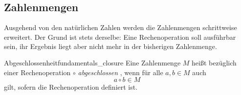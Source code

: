 \subsection{Zahlenmengen}
\label{subsec:fundamentals_number_sets}

Ausgehend von den natürlichen Zahlen werden die Zahlenmengen schrittweise
erweitert. Der Grund ist stets derselbe: Eine Rechenoperation soll ausführbar
sein, ihr Ergebnis liegt aber nicht mehr in der bisherigen Zahlenmenge.

\begin{DefinitionBox}{Abgeschlossenheit}{fundamentals_closure}
  Eine Zahlenmenge $M$ heißt bezüglich einer Rechenoperation $\circ$
  \emph{abgeschlossen} , wenn für alle $a,b\in M$ auch
  \[
    a\circ b\in M
  \]
  gilt, sofern die Rechenoperation definiert ist.
\end{DefinitionBox}






